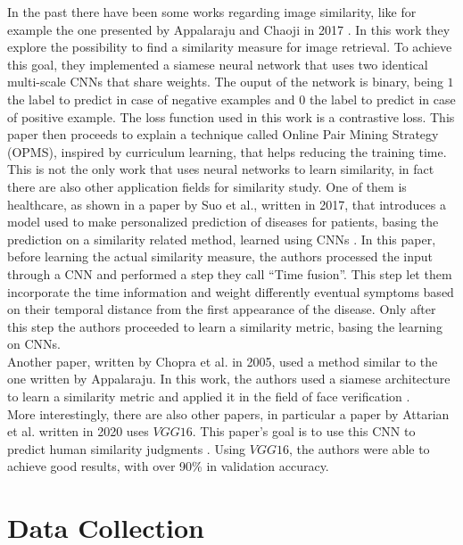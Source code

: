 \documentclass[conference]{IEEEtran}
\begin{document}
				\noindent In the past there have been some works regarding image similarity, like for example the one presented by Appalaraju and Chaoji in 2017 \cite{appalaraju2017image}. In this work they explore the possibility to 
				find a similarity measure for image retrieval. To achieve this goal, they implemented a siamese neural network that uses two identical multi-scale CNNs that share weights. The ouput of the 
				network is binary, being $1$ the label to predict in case of negative examples and $0$ the label to predict in case of positive example. The loss function used in this work is a contrastive loss. This paper 
				then proceeds to explain a technique called Online Pair Mining Strategy (OPMS), inspired by curriculum learning, that helps reducing the training time. \\
				This is not the only work that uses neural networks to learn similarity, in fact there are also other application fields for similarity study. One of them is healthcare, as shown in a paper by Suo et al., written in 
				2017, that introduces a model used to make personalized prediction of diseases for patients, basing the prediction on a similarity related method, learned using CNNs \cite{8217759}. In this paper, before 
				learning the actual similarity measure, the authors processed the input through a CNN and performed a step they call ``Time fusion''. This step let them incorporate the time information and 
				weight differently eventual symptoms based on their temporal distance from the first appearance of the disease. Only after this step the authors proceeded to learn a similarity metric, basing the learning 
				on CNNs.\\
				Another paper, written by Chopra et al. in 2005, used a method similar to the one written by Appalaraju. In this work, the authors used a siamese architecture to learn a similarity metric and applied it 
				in the field of face verification \cite{chopra2005learning}.\\
				More interestingly, there are also other papers, in particular a paper by Attarian et al. written in 2020 uses $VGG16$. This paper's goal is to use this CNN to predict human similarity 
				judgments \cite{attarian2020transforming}. Using $VGG16$, the authors were able to achieve good results, with over 90\% in validation accuracy.
				
	\section{Data Collection}
\end{document}
